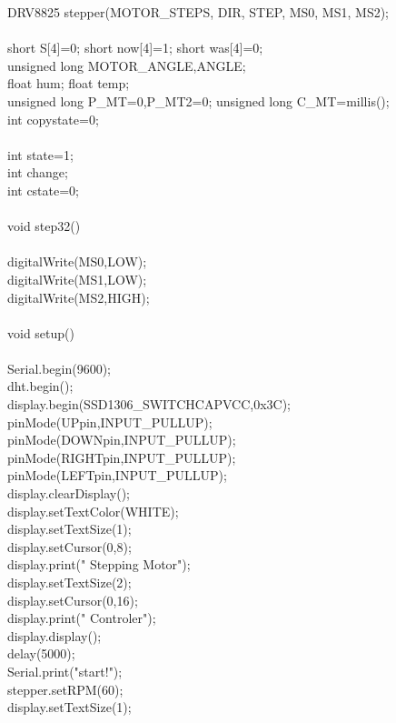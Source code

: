 DRV8825 stepper(MOTOR\_STEPS, DIR, STEP, MS0, MS1, MS2);\\
\\
short S[4]={0}; short now[4]={1}; short was[4]={0};\\
unsigned long MOTOR\_ANGLE,ANGLE;\\
float hum; float temp;\\
unsigned long P\_MT=0,P\_MT2=0; unsigned long C\_MT=millis();\\
int copystate=0;\\
\\
int state=1;\\
int change;\\
int cstate=0;\\
\\
void step32()\\
{\\
	digitalWrite(MS0,LOW);\\
	digitalWrite(MS1,LOW);\\
	digitalWrite(MS2,HIGH);\\
}\\
void setup()\\
{\\
	Serial.begin(9600);\\
	dht.begin();\\
	display.begin(SSD1306\_SWITCHCAPVCC,0x3C);\\
	pinMode(UPpin,INPUT\_PULLUP);\\
	pinMode(DOWNpin,INPUT\_PULLUP);\\
	pinMode(RIGHTpin,INPUT\_PULLUP);\\
	pinMode(LEFTpin,INPUT\_PULLUP);\\
	display.clearDisplay();\\
	display.setTextColor(WHITE);\\
	display.setTextSize(1);\\
	display.setCursor(0,8);\\
	display.print("    Stepping Motor");\\
	display.setTextSize(2);\\
	display.setCursor(0,16);\\
	display.print(" Controler");\\
	display.display();\\
	delay(5000);\\
	Serial.print("start!");\\
	stepper.setRPM(60);\\
	display.setTextSize(1);\\
}\\
